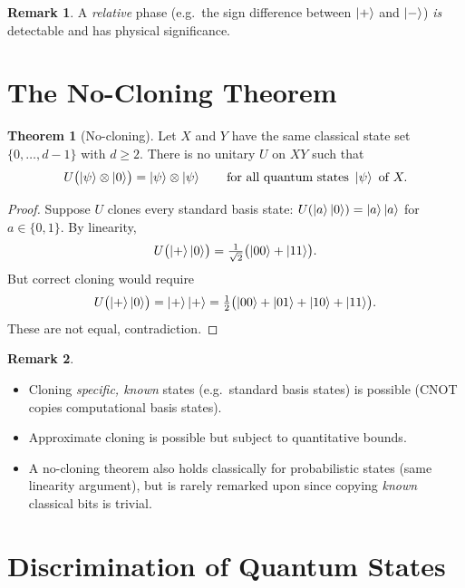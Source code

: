 \documentclass[11pt]{article}
\theoremstyle{definition}
\newtheorem{remark}{Remark}[section]
\newtheorem{theorem}{Theorem}[section]
\begin{document}
\begin{remark}
A \emph{relative} phase (e.g.\ the sign difference between $\ket{+}$ and $\ket{-}$) \emph{is} detectable and has physical significance.
\end{remark}

\section{The No-Cloning Theorem}

\begin{theorem}[No-cloning]
Let $X$ and $Y$ have the same classical state set $\{0,\dots,d-1\}$ with $d\ge 2$.  There is no unitary $U$ on $XY$ such that
\[
    U\bigl(\ket{\psi}\otimes\ket{0}\bigr) = \ket{\psi}\otimes\ket{\psi}
    \qquad\text{for all quantum states } \ket{\psi} \text{ of } X.
\]
\end{theorem}

\begin{proof}
Suppose $U$ clones every standard basis state: $U(\ket{a}\ket{0})=\ket{a}\ket{a}$ for $a\in\{0,1\}$.  By linearity,
\[
    U\bigl(\ket{+}\ket{0}\bigr)
    = \tfrac{1}{\sqrt{2}}\bigl(\ket{00}+\ket{11}\bigr).
\]
But correct cloning would require
\[
    U\bigl(\ket{+}\ket{0}\bigr) = \ket{+}\ket{+}
    = \tfrac{1}{2}\bigl(\ket{00}+\ket{01}+\ket{10}+\ket{11}\bigr).
\]
These are not equal, contradiction.
\end{proof}

\begin{remark}\leavevmode
\begin{itemize}
    \item Cloning \emph{specific, known} states (e.g.\ standard basis states) is possible (CNOT copies computational basis states).
    \item Approximate cloning is possible but subject to quantitative bounds.
    \item A no-cloning theorem also holds classically for probabilistic states (same linearity argument), but is rarely remarked upon since copying \emph{known} classical bits is trivial.
\end{itemize}
\end{remark}

\section{Discrimination of Quantum States}
\end{document}
